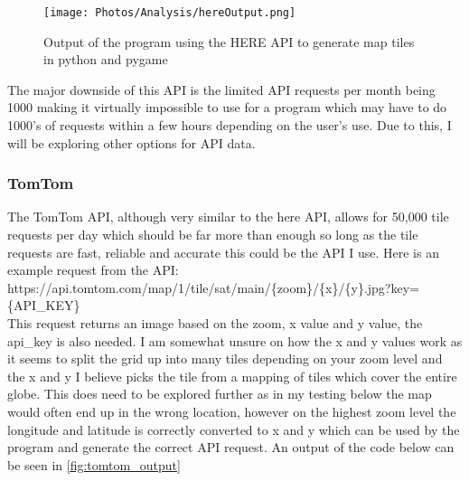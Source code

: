 \documentclass{article}
\begin{document}
            \begin{figure}[ht]
                \centering
                \texttt{[image: Photos/Analysis/hereOutput.png]}
                \caption{Output of the program using the HERE API to generate map tiles in python and pygame}
                \label{fig:here_output}
             \end{figure}
    
             The major downside of this API is the limited API requests per month being 1000 making it virtually impossible to use for a program which may have to do 1000's of requests within a few hours depending on the user's use. Due to this, I will be exploring other options for API data.

        \subsubsection{TomTom}

            The TomTom API, although very similar to the here API, allows for 50,000 tile requests per day which should be far more than enough so long as the tile requests are fast, reliable and accurate this could be the API I use. Here is an example request from the API: \\

            \noindent
            https://api.tomtom.com/map/1/tile/sat/main/\{zoom\}/\{x\}/\{y\}.jpg?key=\{API\_KEY\} \\

            This request returns an image based on the zoom, x value and y value, the api\_key is also needed. I am somewhat unsure on how the x and y values work as it seems to split the grid up into many tiles depending on your zoom level and the x and y I believe picks the tile from a mapping of tiles which cover the entire globe. This does need to be explored further as in my testing below the map would often end up in the wrong location, however on the highest zoom level the longitude and latitude is correctly converted to x and y which can be used by the program and generate the correct API request. An output of the code below can be seen in \cref{fig:tomtom_output}
                
        
\end{document}
